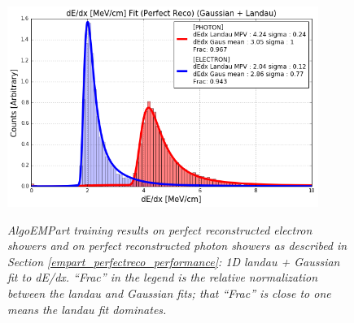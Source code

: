 \begin{figure}[ht!]
\centering
\includegraphics[width=0.9\textwidth]{Figures/EMPartTraining/mc_trained/dEdx_Selected_both.png}\\
\caption{\textit{AlgoEMPart training results on perfect reconstructed electron showers and on perfect reconstructed photon showers as described in Section \ref{empart_perfectreco_performance}: 1D landau + Gaussian fit to dE/dx. ``Frac'' in the legend is the relative normalization between the landau and Gaussian fits; that ``Frac'' is close to one means the landau fit dominates.}}
\label{empart_perfectreco_performance_fig2}
\end{figure}






